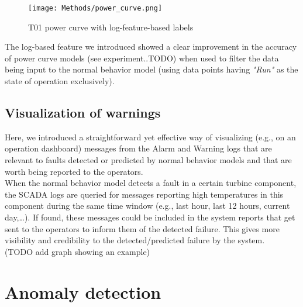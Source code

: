   \begin{figure}[!htbp]
    \begin{center}
      \texttt{[image: Methods/power\_curve.png]}
    \end{center}
    \caption{T01 power curve with log-feature-based labels}
    \label{fig:power_curve}
  \end{figure}

  The log-based feature we introduced showed a clear improvement in the accuracy of power curve models (see experiment..TODO) when used to filter the data being input 
  to the normal behavior model (using data points having \emph{"Run"} as the state of operation exclusively).

\subsection{Visualization of warnings}
  Here, we introduced a straightforward yet effective way of visualizing (e.g., on an operation dashboard) messages from the Alarm and Warning logs that are relevant 
  to faults detected or predicted by normal behavior models and that are worth being reported to the operators.\\
  When the normal behavior model detects a fault in a certain turbine component, the SCADA logs are queried for messages reporting high temperatures in this component 
  during the same time window (e.g., last hour, last 12 hours, current day,\dots). If found, these messages could be included in the system reports that get sent to the operators
  to inform them of the detected failure. This gives more visibility and credibility to the detected/predicted failure by the system.\\
  (TODO add graph showing an example)

  \clearpage

\section{Anomaly detection}
